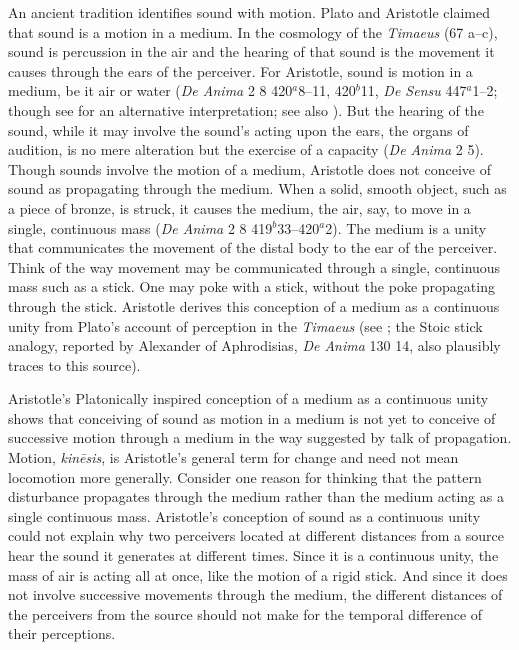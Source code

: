 An ancient tradition identifies sound with motion. Plato and Aristotle claimed that sound is a motion in a medium. In the cosmology of the \emph{Timaeus} (67 a--c), sound is percussion in the air and the hearing of that sound is the movement it causes through the ears of the perceiver. For Aristotle, sound is motion in a medium, be it air or water (\emph{De Anima} 2 8 420\( ^{a} \)8--11, 420\( ^{b} \)11, \emph{De Sensu} 447\( ^{a} \)1--2; though see \citealt[60--1]{OCallaghan:2007xy} for an alternative interpretation; see also \citealt{Johnstone:2013la}). But the hearing of the sound, while it may involve the sound's acting upon the ears, the organs of audition, is no mere alteration but the exercise of a capacity (\emph{De Anima} 2 5). Though sounds involve the motion of a medium, Aristotle does not conceive of sound as propagating through the medium. When a solid, smooth object, such as a piece of bronze, is struck, it causes the medium, the air, say, to move in a single, continuous mass (\emph{De Anima} 2 8 419\( ^{b} \)33--420\( ^{a} \)2). The medium is a unity that communicates the movement of the distal body to the ear of the perceiver. Think of the way movement may be communicated through a single, continuous mass such as a stick. One may poke with a stick, without the poke propagating through the stick. Aristotle derives this conception of a medium as a continuous unity from Plato's account of perception in the \emph{Timaeus} (see \citealt[chapter 1]{Lindberg:1977aa}; the Stoic stick analogy, reported by Alexander of Aphrodisias, \emph{De Anima} 130 14, also plausibly traces to this source). 

Aristotle's Platonically inspired conception of a medium as a continuous unity shows that conceiving of sound as motion in a medium is not yet to conceive of successive motion through a medium in the way suggested by talk of propagation. Motion, \emph{kinēsis}, is Aristotle's general term for change and need not mean locomotion more generally. Consider one reason for thinking that the pattern disturbance propagates through the medium rather than the medium acting as a single continuous mass. Aristotle's conception of sound as a continuous unity could not explain why two perceivers located at different distances from a source hear the sound it generates at different times. Since it is a continuous unity, the mass of air is acting all at once, like the motion of a rigid stick. And since it does not involve successive movements through the medium, the different distances of the perceivers from the source should not make for the temporal difference of their perceptions. 

